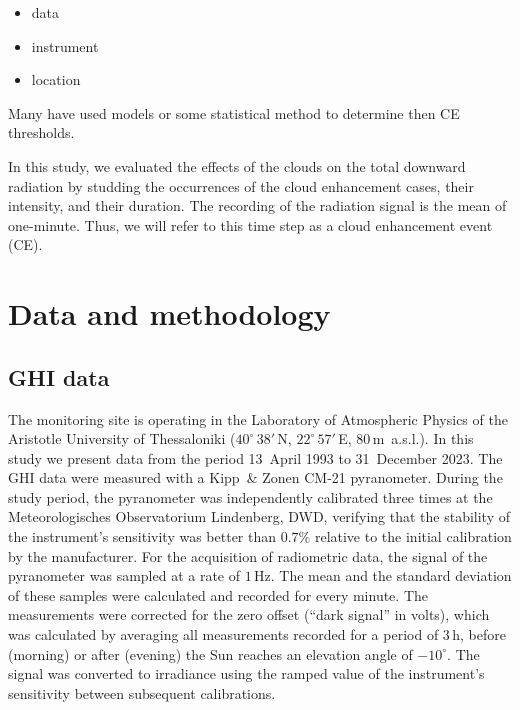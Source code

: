 \documentclass[
]{article}
\providecommand{\tightlist}{%
  \setlength{\itemsep}{0pt}\setlength{\parskip}{0pt}}
\begin{document}
\begin{itemize}
\tightlist
\item
  data
\item
  instrument
\item
  location
\end{itemize}

Many have used models or some statistical method to determine then CE thresholds.

In this study, we evaluated the effects of the clouds on the total downward radiation
by studding the occurrences of the cloud enhancement cases, their intensity, and their
duration. The recording of the radiation signal is the mean of one-minute. Thus, we
will refer to this time step as a cloud enhancement event (CE).

\hypertarget{data-and-methodology}{%
\section{Data and methodology}\label{data-and-methodology}}

\hypertarget{ghi-data}{%
\subsection{GHI data}\label{ghi-data}}

The monitoring site is operating in the Laboratory of Atmospheric Physics of the
Aristotle University of Thessaloniki (\(40^\circ\,38'\,\)N,
\(22^\circ\,57'\,\)E, \(80\,\)m~a.s.l.).
In this study we present data from the period
13~April 1993 to
31~December 2023.
The GHI data were measured with a Kipp~\& Zonen CM-21 pyranometer. During the study
period, the pyranometer was independently calibrated three times at the
Meteorologisches Observatorium Lindenberg, DWD, verifying that the stability of the
instrument's sensitivity was better than \(0.7\%\) relative to the initial calibration
by the manufacturer.
For the acquisition of radiometric data, the signal of the pyranometer was sampled at
a rate of \(1\,\text{Hz}\). The mean and the standard deviation of these samples were
calculated and recorded for every minute. The measurements were corrected for the
zero offset (``dark signal'' in volts), which was calculated by averaging all
measurements recorded for a period of \(3\,\text{h}\), before (morning) or after
(evening) the Sun reaches an elevation angle of \(-10^\circ\). The signal was
converted to irradiance using the ramped value of the instrument's sensitivity
between subsequent calibrations.
\end{document}

